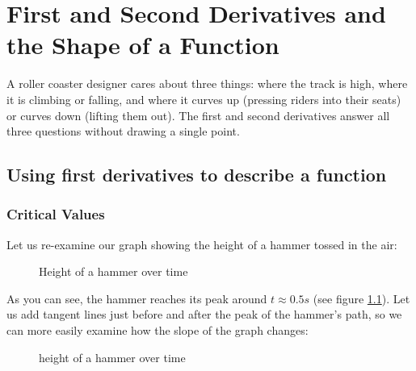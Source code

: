 \chapter{First and Second Derivatives and the Shape of a Function}
A roller coaster designer cares about three things: where the track is
high, where it is climbing or falling, and where it curves up (pressing
riders into their seats) or curves down (lifting them out). The first and
second derivatives answer all three questions without drawing a single
point.

\section{Using first derivatives to describe a function}
\subsection{Critical Values}

Let us re-examine our graph showing the height of a hammer tossed in the air:

\begin{figure}[H]
\centering
{}
\caption{Height of a hammer over time}
\label{ref:hammerh}
\end{figure}


As you can see, the hammer reaches its peak around $t \approx 0.5s$ (see 
figure \ref{ref:hammerh}). Let us add tangent lines just before and after the 
peak of the hammer's path, so we can more easily examine how the slope of the 
graph changes:

\begin{figure}[H]
\centering
{}
\caption{height of a hammer over time}
\label{ref:hammerh2}
\end{figure}


